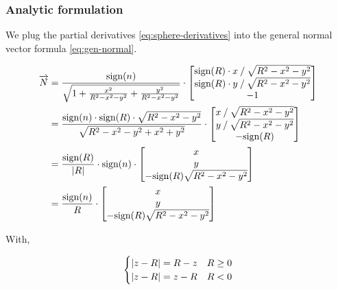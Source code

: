 \subsubsection{Analytic formulation}
We plug the partial derivatives \cref{eq:sphere-derivatives} into the general
normal vector formula \cref{eq:gen-normal}.

\begin{equation} \begin{split}
\overrightarrow{N} & = \frac{\textrm{sign}(n)}
{\sqrt{1 + \frac{x^2}{R^2 - x^2 - y^2} + \frac{y^2}{R^2 - x^2 - y^2}}} \cdot
\begin{bmatrix}
\textrm{sign}(R) \cdot x \mathbin{/} \sqrt{R^2 - x^2 - y^2} \\
\textrm{sign}(R) \cdot y \mathbin{/} \sqrt{R^2 - x^2 - y^2} \\
-1
\end{bmatrix} \\
& = \frac{\textrm{sign}(n) \cdot \textrm{sign}(R) \cdot
          \sqrt{R^2 - x^2 - y^2}}
         {\sqrt{R^2 - x^2 - y^2 + x^2 + y^2}} \cdot
\begin{bmatrix}
x \mathbin{/} \sqrt{R^2 - x^2 - y^2} \\
y \mathbin{/} \sqrt{R^2 - x^2 - y^2} \\
-\textrm{sign}(R)
\end{bmatrix} \\
& = \frac{\textrm{sign}(R)}{\abs{R}} \cdot \textrm{sign}(n) \cdot
\begin{bmatrix}
x \\ y \\
- \textrm{sign}(R) \sqrt{R^2 - x^2 - y^2}
\end{bmatrix} \\
& = \frac{\textrm{sign}(n)}{R} \cdot
\begin{bmatrix}
x \\ y \\
- \textrm{sign}(R) \sqrt{R^2 - x^2 - y^2}
\end{bmatrix}
\end{split} \end{equation}

With,

\begin{equation} \begin{cases}
\abs{z-R} = R - z & R \geq 0 \\
\abs{z-R} = z - R & R < 0
\end{cases} \end{equation}

